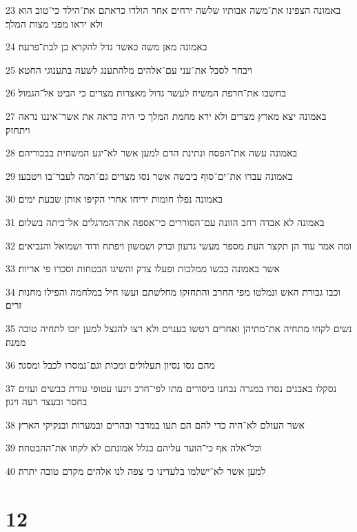 \par 23 באמונה הצפינו את־משה אבותיו שלשה ירחים אחר הולדו כראתם את־הילד כי־טוב הוא ולא יראו מפני מצות המלך׃
\par 24 באמונה מאן משה כאשר גדל להקרא בן לבת־פרעה׃
\par 25 ויבחר לסבל את־עני עם־אלהים מלהתענג לשעה בתענוגי החטא׃
\par 26 בחשבו את־חרפת המשיח לעשר גדול מאצרות מצרים כי הביט אל־הגמול׃
\par 27 באמונה יצא מארץ מצרים ולא ירא מחמת המלך כי היה כראה את אשר־איננו נראה ויתחזק׃
\par 28 באמונה עשה את־הפסח ונתינת הדם למען אשר לא־יגע המשחית בבכוריהם׃
\par 29 באמונה עברו את־ים־סוף ביבשה אשר נסו מצרים גם־המה לעבר־בו ויטבעו׃
\par 30 באמונה נפלו חומות יריחו אחרי הקיפו אותן שבעת ימים׃
\par 31 באמונה לא אבדה רחב הזונה עם־הסוררים כי־אספה את־המרגלים אל־ביתה בשלום׃
\par 32 ומה אמר עוד הן תקצר העת מספר מעשי גדעון וברק ושמשון ויפתח ודוד ושמואל והנביאים׃
\par 33 אשר באמונה כבשו ממלכות ופעלו צדק והשיגו הבטחות וסכרו פי אריות׃
\par 34 וכבו גבורת האש ונמלטו מפי החרב והתחזקו מחלשתם ועשו חיל במלחמה והפילו מחנות זרים׃
\par 35 נשים לקחו מתחיה את־מתיהן ואחרים רטשו בענוים ולא רצו להנצל למען יזכו לתחיה טובה ממנה׃
\par 36 מהם נסו נסיון תעלולים ומכות וגם־נמסרו לכבל ומסגר׃
\par 37 נסקלו באבנים נסרו במגרה נבחנו ביסורים מתו לפי־חרב וינעו עטופי עורת כבשים ועזים בחסר ובעצר רעה ויגון׃
\par 38 אשר העולם לא־היה כדי להם הם תעו במדבר ובהרים ובמערות ובנקיקי הארץ׃
\par 39 וכל־אלה אף כי־הועד עליהם בגלל אמונתם לא לקחו את־ההבטחה׃
\par 40 למען אשר לא־ישלמו בלעדינו כי צפה לנו אלהים מקדם טובה יתרה׃

\chapter{12}

